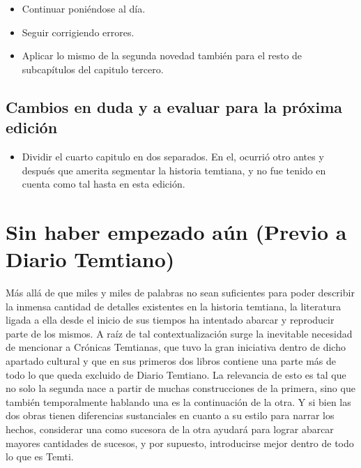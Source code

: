 \documentclass[
  spanish,
]{book}
\providecommand{\tightlist}{%
  \setlength{\itemsep}{0pt}\setlength{\parskip}{0pt}}
\begin{document}
\begin{itemize}
\tightlist
\item
  Continuar poniéndose al día.
\item
  Seguir corrigiendo errores.
\item
  Aplicar lo mismo de la segunda novedad también para el resto de subcapítulos del capitulo tercero.
\end{itemize}

\hypertarget{cambios-en-duda-y-a-evaluar-para-la-pruxf3xima-ediciuxf3n}{%
\section*{Cambios en duda y a evaluar para la próxima edición}\label{cambios-en-duda-y-a-evaluar-para-la-pruxf3xima-ediciuxf3n}}

\begin{itemize}
\tightlist
\item
  Dividir el cuarto capitulo en dos separados. En el, ocurrió otro antes y después que amerita segmentar la historia temtiana, y no fue tenido en cuenta como tal hasta en esta edición.
\end{itemize}

\hypertarget{sin-haber-empezado-auxfan-previo-a-diario-temtiano}{%
\chapter{Sin haber empezado aún (Previo a Diario Temtiano)}\label{sin-haber-empezado-auxfan-previo-a-diario-temtiano}}

Más allá de que miles y miles de palabras no sean suficientes para poder describir la inmensa cantidad de detalles existentes en la historia temtiana, la literatura ligada a ella desde el inicio de sus tiempos ha intentado abarcar y reproducir parte de los mismos. A raíz de tal contextualización surge la inevitable necesidad de mencionar a Crónicas Temtianas, que tuvo la gran iniciativa dentro de dicho apartado cultural y que en sus primeros dos libros contiene una parte más de todo lo que queda excluido de Diario Temtiano.
La relevancia de esto es tal que no solo la segunda nace a partir de muchas construcciones de la primera, sino que también temporalmente hablando una es la continuación de la otra. Y si bien las dos obras tienen diferencias sustanciales en cuanto a su estilo para narrar los hechos, considerar una como sucesora de la otra ayudará para lograr abarcar mayores cantidades de sucesos, y por supuesto, introducirse mejor dentro de todo lo que es Temti.
\end{document}
